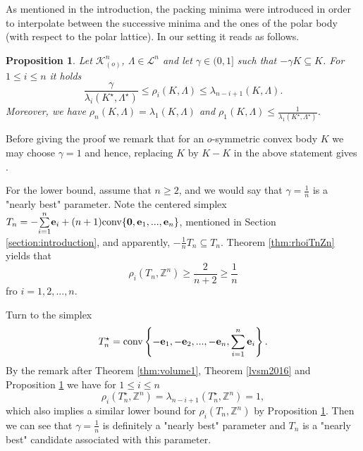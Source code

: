 \documentclass{amsart}
\newtheorem{prop}[theorem]{Proposition}
\theoremstyle{definition}
\theoremstyle{remark}
\numberwithin{equation}{section}
\begin{document}
As mentioned in the introduction, the packing minima were introduced in order to interpolate between the successive minima and the ones of the polar body (with respect to the polar lattice). In our setting it reads as follows. 

\begin{prop} Let ${\mathcal K}^n_{(o)}$, $\Lambda\in{\mathcal L}^n$ and let $\gamma\in(0,1]$ such that $-\gamma K\subseteq K$. For $1\leq i\leq n$ it holds 
$$
                       \frac{\gamma}{\lambda_i(K^\star,\Lambda^\star)} \leq \rho_i(K,\Lambda)\leq\lambda_{n-i+1}(K,\Lambda).
$$
Moreover, we have  $\rho_n(K,\Lambda)=\lambda_1(K,\Lambda)$ and $\rho_1(K,\Lambda)\leq \frac{1}{\lambda_1(K^\star,\Lambda^\star)}$.  
\label{prop:trans}
\end{prop}

Before giving the proof we remark that for an $o$-symmetric convex body $K$ we may choose $\gamma=1$ 
and hence, replacing $K$ by $K-K$ in the above statement gives \cite[Proposition 1.1]{hsx2021}. 

For the lower bound, assume that $n\ge2$, and we would say that $\gamma=\frac{1}{n}$ is a "nearly best" parameter. Note the centered simplex $T_n=-\overset{n}{\underset{i=1}{\sum}}{\bf e}_i+(n+1)\mathrm{conv}\{{\bf 0},{\bf e}_1,...,{\bf e}_n\}$, mentioned in Section \ref{section:introduction}, and apparently, $-\frac{1}{n}T_n\subseteq T_n$. Theorem \ref{thm:rhoiTnZn} yields that $$\rho_i(T_n,\mathbb{Z}^n)\ge\frac{2}{n+2}\ge\frac{1}{n}$$ fro $i=1,2,...,n$.

Turn to the simplex
$$T_n^\star=\mathrm{conv}\left\{-{\bf e}_1, -{\bf e}_2, ..., -{\bf e}_n, \sum_{i=1}^n {\bf e}_i\right\}.$$
By the remark after Theorem \ref{thm:volume1}, Theorem \ref{lvsm2016} and Proposition \ref{prop:trans} we have for $1\leq i\leq n$ 
\begin{equation*}\label{eq:Tn*}
     \rho_i(T_n^\star,\mathbb{Z}^n)=\lambda_{n-i+1}(T_n^\star,\mathbb{Z}^n)=1, 
\end{equation*}
which also implies a similar lower bound for $\rho_i(T_n,\mathbb{Z}^n)$ by Proposition \ref{prop:trans}. 
Then we can see that $\gamma=\frac{1}{n}$ is definitely a "nearly best" parameter and $T_n$ is a "nearly best" candidate associated with this parameter.
\end{document}
